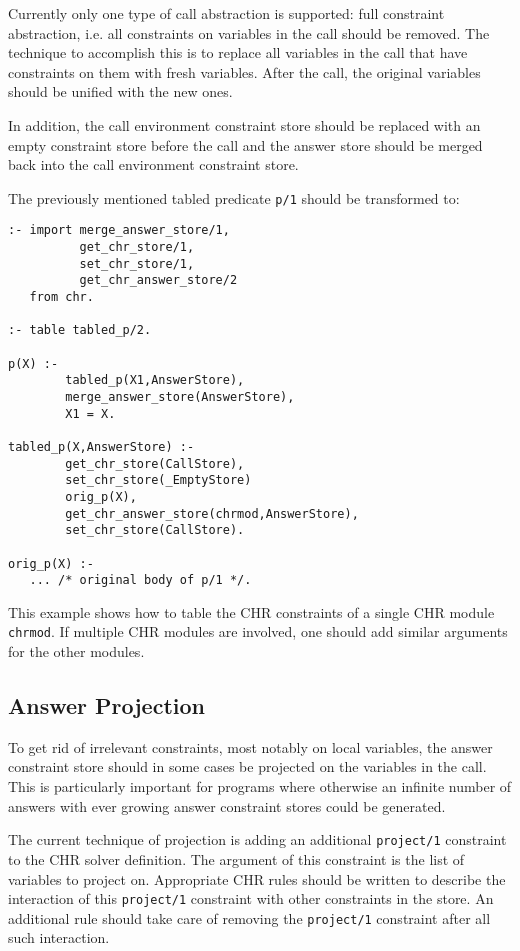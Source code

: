 Currently only one type of call abstraction is supported: full constraint
abstraction, i.e. all constraints on variables in the call should be
removed. The technique to accomplish this is to replace all variables in
the call that have constraints on them with fresh variables. After the call,
the original variables should be unified with the new ones.

In addition, the call environment constraint store should be replaced with an
empty constraint store before the call and the answer store should be merged
back into the call environment constraint store.

The previously mentioned tabled predicate \texttt{p/1} should be transformed
 to:

\begin{small}
\begin{verbatim}
:- import merge_answer_store/1, 
          get_chr_store/1,
          set_chr_store/1,
          get_chr_answer_store/2
   from chr.

:- table tabled_p/2.

p(X) :-
        tabled_p(X1,AnswerStore),
        merge_answer_store(AnswerStore),
        X1 = X.

tabled_p(X,AnswerStore) :-
        get_chr_store(CallStore),
        set_chr_store(_EmptyStore)
        orig_p(X),
        get_chr_answer_store(chrmod,AnswerStore),
        set_chr_store(CallStore).

orig_p(X) :-
   ... /* original body of p/1 */.
\end{verbatim}
\end{small}

This example shows how to table the CHR constraints of a single CHR module
\texttt{chrmod}. If multiple CHR modules are involved, one should add similar
arguments for the other modules.

\subsection{Answer Projection}

To get rid of irrelevant constraints, most notably on local variables, the answer
constraint store should in some cases be projected on the variables in the call.
This is particularly important for programs where otherwise an infinite number 
of answers with ever growing answer constraint stores could be generated.

The current technique of projection is adding an additional \texttt{project/1}
constraint to the CHR solver definition. The argument of this constraint is
the list of variables to project on. Appropriate CHR rules should be written
to describe the interaction of this \texttt{project/1} constraint with other
constraints in the store. An additional rule should take care of removing
the \texttt{project/1} constraint after all such interaction.

